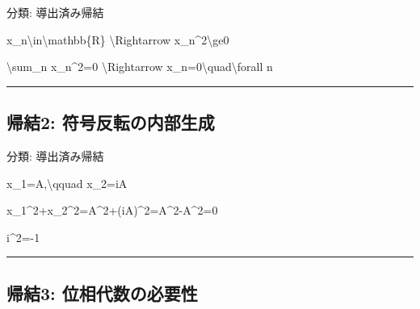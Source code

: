 \documentclass[
  a4paper,
]{ltjsarticle}
\newenvironment{Shaded}{}{}
\newcommand{\NormalTok}[1]{#1}
\begin{document}
分類: 導出済み帰結

\begin{Shaded}
\begin{Highlighting}[]
\NormalTok{x\_n\textbackslash{}in\textbackslash{}mathbb\{R\}}
\NormalTok{\textbackslash{}Rightarrow}
\NormalTok{x\_n\^{}2\textbackslash{}ge0}
\end{Highlighting}
\end{Shaded}

\begin{Shaded}
\begin{Highlighting}[]
\NormalTok{\textbackslash{}sum\_n x\_n\^{}2=0}
\NormalTok{\textbackslash{}Rightarrow}
\NormalTok{x\_n=0\textbackslash{}quad\textbackslash{}forall n}
\end{Highlighting}
\end{Shaded}

\begin{center}\rule{0.5\linewidth}{0.5pt}\end{center}

\subsection{帰結2:
符号反転の内部生成}\label{ux5e30ux7d502-ux7b26ux53f7ux53cdux8ee2ux306eux5185ux90e8ux751fux6210}

分類: 導出済み帰結

\begin{Shaded}
\begin{Highlighting}[]
\NormalTok{x\_1=A,\textbackslash{}qquad x\_2=iA}
\end{Highlighting}
\end{Shaded}

\begin{Shaded}
\begin{Highlighting}[]
\NormalTok{x\_1\^{}2+x\_2\^{}2=A\^{}2+(iA)\^{}2=A\^{}2{-}A\^{}2=0}
\end{Highlighting}
\end{Shaded}

\begin{Shaded}
\begin{Highlighting}[]
\NormalTok{i\^{}2={-}1}
\end{Highlighting}
\end{Shaded}

\begin{center}\rule{0.5\linewidth}{0.5pt}\end{center}

\subsection{帰結3:
位相代数の必要性}\label{ux5e30ux7d503-ux4f4dux76f8ux4ee3ux6570ux306eux5fc5ux8981ux6027}
\end{document}

